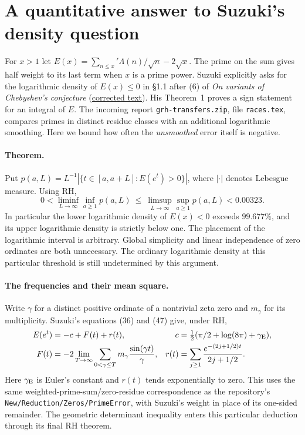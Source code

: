 \section{A quantitative answer to Suzuki's density question}
\label{sec:suzuki-density}
For $x>1$ let $E(x)=\sum_{n\le x}'\Lambda(n)/\sqrt n-2\sqrt x$.
The prime on the sum gives half weight to its last term when $x$ is a prime power.
Suzuki explicitly asks for the logarithmic density of $E(x)\le0$ in
\S1.1 after (6) of \emph{On variants of Chebyshev's conjecture}
(\href{https://arxiv.org/html/2411.07436v3}{corrected text}).
His Theorem~1 proves a sign statement for an integral of $E$.
The incoming report \texttt{grh-transfers.zip}, file \texttt{races.tex},
compares primes in distinct residue classes with an additional logarithmic smoothing.
Here we bound how often the \emph{unsmoothed} error itself is negative.

\paragraph{Theorem.}
Put $p(a,L)=L^{-1}|\{t\in[a,a+L]:E(e^t)>0\}|$, where $|\cdot|$
denotes Lebesgue measure. Using RH,
\[
 0<\liminf_{L\to\infty}\inf_{a\ge1}p(a,L)
 \ \le\ \limsup_{L\to\infty}\sup_{a\ge1}p(a,L)<0.00323 .
\]
In particular the lower logarithmic density of $E(x)<0$ exceeds
$99.677\%$, and its upper logarithmic density is strictly below one.
The placement of the logarithmic interval is arbitrary. Global simplicity
and linear independence of zero ordinates are both unnecessary.
The ordinary logarithmic density at this particular threshold is still undetermined by this argument.

\paragraph{The frequencies and their mean square.}
Write $\gamma$ for a distinct positive ordinate of a nontrivial zeta zero and
$m_\gamma$ for its multiplicity. Suzuki's equations (36) and (47) give, under RH,
\begin{align*}
 E(e^t)&=-c+F(t)+r(t),&
 c&=\tfrac12(\pi/2+\log(8\pi)+\gamma_{\rm E}),\\
 F(t)&=-2\lim_{T\to\infty}\sum_{0<\gamma\le T}
                 m_\gamma\frac{\sin(\gamma t)}{\gamma},&
 r(t)&=\sum_{j\ge1}\frac{e^{-(2j+1/2)t}}{2j+1/2}.
\end{align*}
Here $\gamma_{\rm E}$ is Euler's constant and $r(t)$ tends exponentially to zero.
This uses the same weighted-prime-sum/zero-residue correspondence as the
repository's \texttt{New/Reduction/Zeros/PrimeError}, with Suzuki's
weight in place of its one-sided remainder. The geometric determinant
inequality enters this particular deduction through its final RH theorem.

